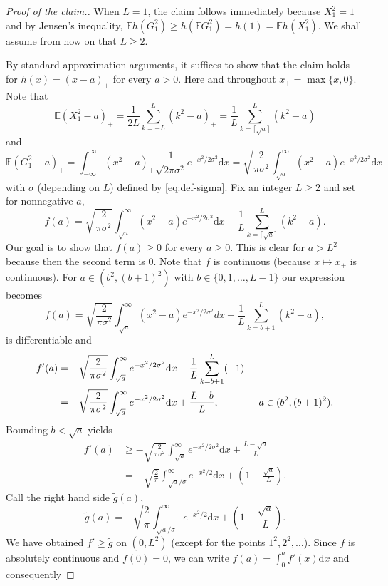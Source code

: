 \documentclass[10pt]{article}
\newcommand{\dd}{\mathrm{d}}
\newcommand{\E}{\mathbb{E}}
\newcommand{\1}{\textbf{1}}
\theoremstyle{remark}
\theoremstyle{definition}
\begin{document}
\begin{proof}[Proof of the claim.]
When $L=1$, the claim follows immediately because $X_1^2 = 1$ and by Jensen's inequality, $\E h(G_1^2) \geq h(\E G_1^2) = h(1) = \E h(X_1^2)$. We shall assume from now on that $L \geq 2$.

By standard approximation arguments, it suffices to show that the claim holds for $h(x) = (x-a)_+$ for every $a > 0$. Here and throughout $x_+ = \max\{x,0\}$. Note that 
\[
\mathbb{E}(X_1^2-a)_+ = \frac{1}{2L}\sum_{k=-L}^L(k^2-a)_+ = \frac{1}{L}\sum_{k = \lceil \sqrt{a} \rceil}^L (k^2-a)
\]
and
\[
\mathbb{E}(G_1^2-a)_+ = \int_{-\infty}^{\infty}(x^2-a)_+\frac{1}{\sqrt{2 \pi \sigma^2}}e^{-x^2/2\sigma^2}\dd x =\sqrt{\frac{2}{\pi \sigma^2}}\int_{\sqrt{a}}^{\infty}(x^2-a)e^{-x^2/2\sigma^2}\dd x
\]
with $\sigma$ (depending on $L$) defined by \eqref{eq:def-sigma}.
Fix an integer $L \geq 2$ and set for nonnegative $a$,
\[
f(a) = \sqrt{\frac{2}{\pi \sigma^2}}\int_{\sqrt{a}}^{\infty}(x^2-a)e^{-x^2/2\sigma^2}\dd x-\frac{1}{L}\sum_{k = \lceil \sqrt{a} \rceil}^L (k^2-a).
\]
Our goal is to show that $f(a) \geq 0$ for every $a \geq 0$. This is clear for $a > L^2$ because then the second term is $0$. Note that $f$ is continuous (because $x \mapsto x_+$ is continuous). For $a \in (b^2, (b+1)^2)$ with $b \in \{0,1,\ldots,L-1\}$ our expression becomes 
\[
f(a) = \sqrt{\frac{2}{\pi \sigma^2}}\int_{\sqrt{a}}^{\infty}(x^2-a)e^{-x^2/2\sigma^2}dx-\frac{1}{L}\sum_{k=b+1}^L (k^2-a),
\]
is differentiable and
\begin{align}
f'(a) &= -\sqrt{\frac{2}{\pi \sigma^2}}\int_{\sqrt{a}}^{\infty}e^{-x^2/2 \sigma^2}\dd x- \frac{1}{L}\sum_{k = b+1}^L (-1) \notag\\
&= -\sqrt{\frac{2}{\pi \sigma^2}}\int_{\sqrt{a}}^{\infty}e^{-x^2/2 \sigma^2}\dd x + \frac{L-b}{L}, \qquad\qquad a \in (b^2,(b+1)^2).\label{eq:f'}
\end{align}
Bounding $b < \sqrt{a}$ yields
\begin{align*}
f'(a) &\geq -\sqrt{\frac{2}{\pi \sigma^2}}\int_{\sqrt{a}}^{\infty}e^{-x^2/2 \sigma^2}\dd x + \frac{L-\sqrt{a}}{L} \\
&= -\sqrt{\frac{2}{\pi}}\int_{\sqrt{a}/\sigma}^{\infty}e^{-x^2/2}\dd x + \left(1 - \frac{\sqrt{a}}{L}\right).
\end{align*}
Call the right hand side $\tilde g(a)$,
\[
\tilde g(a) = -\sqrt{\frac{2}{\pi}}\int_{\sqrt{a}/\sigma}^{\infty}e^{-x^2/2}\dd x + \left(1 - \frac{\sqrt{a}}{L}\right).
\]
We have obtained $f' \geq \tilde g$ on $(0,L^2)$ (except for the points $1^2, 2^2, \ldots$). Since $f$ is absolutely continuous and $f(0) = 0$, we can write $f(a) = \int_0^a f'(x) \dd x$ and consequently

\end{proof}
\end{document}

